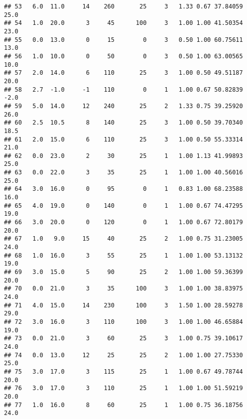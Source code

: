 \documentclass[
]{article}
\newenvironment{Shaded}{\begin{snugshade}}{\end{snugshade}}
\newcommand{\CommentTok}[1]{\textcolor[rgb]{0.56,0.35,0.01}{\textit{#1}}}
\newcommand{\FunctionTok}[1]{\textcolor[rgb]{0.00,0.00,0.00}{#1}}
\newcommand{\NormalTok}[1]{#1}
\newcommand{\OtherTok}[1]{\textcolor[rgb]{0.56,0.35,0.01}{#1}}
\newcommand{\SpecialCharTok}[1]{\textcolor[rgb]{0.00,0.00,0.00}{#1}}
\newcommand{\StringTok}[1]{\textcolor[rgb]{0.31,0.60,0.02}{#1}}
\begin{document}
\begin{verbatim}
## 53   6.0  11.0     14    260       25     3   1.33 0.67 37.84059      25.0
## 54   1.0  20.0      3     45      100     3   1.00 1.00 41.50354      23.0
## 55   0.0  13.0      0     15        0     3   0.50 1.00 60.75611      13.0
## 56   1.0  10.0      0     50        0     3   0.50 1.00 63.00565      10.0
## 57   2.0  14.0      6    110       25     3   1.00 0.50 49.51187      20.0
## 58   2.7  -1.0     -1    110        0     1   1.00 0.67 50.82839      -2.0
## 59   5.0  14.0     12    240       25     2   1.33 0.75 39.25920      26.0
## 60   2.5  10.5      8    140       25     3   1.00 0.50 39.70340      18.5
## 61   2.0  15.0      6    110       25     3   1.00 0.50 55.33314      21.0
## 62   0.0  23.0      2     30       25     1   1.00 1.13 41.99893      25.0
## 63   0.0  22.0      3     35       25     1   1.00 1.00 40.56016      25.0
## 64   3.0  16.0      0     95        0     1   0.83 1.00 68.23588      16.0
## 65   4.0  19.0      0    140        0     1   1.00 0.67 74.47295      19.0
## 66   3.0  20.0      0    120        0     1   1.00 0.67 72.80179      20.0
## 67   1.0   9.0     15     40       25     2   1.00 0.75 31.23005      24.0
## 68   1.0  16.0      3     55       25     1   1.00 1.00 53.13132      19.0
## 69   3.0  15.0      5     90       25     2   1.00 1.00 59.36399      20.0
## 70   0.0  21.0      3     35      100     3   1.00 1.00 38.83975      24.0
## 71   4.0  15.0     14    230      100     3   1.50 1.00 28.59278      29.0
## 72   3.0  16.0      3    110      100     3   1.00 1.00 46.65884      19.0
## 73   0.0  21.0      3     60       25     3   1.00 0.75 39.10617      24.0
## 74   0.0  13.0     12     25       25     2   1.00 1.00 27.75330      25.0
## 75   3.0  17.0      3    115       25     1   1.00 0.67 49.78744      20.0
## 76   3.0  17.0      3    110       25     1   1.00 1.00 51.59219      20.0
## 77   1.0  16.0      8     60       25     1   1.00 0.75 36.18756      24.0
\end{verbatim}

\begin{Shaded}
\end{Shaded}
\end{document}
